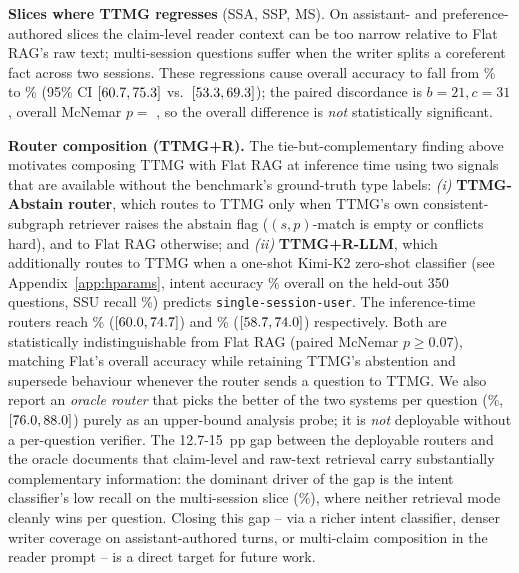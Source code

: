 \textbf{Slices where TTMG regresses} (SSA, SSP, MS). On assistant-
and preference-authored slices the claim-level reader context can be
too narrow relative to Flat RAG's raw text; multi-session questions
suffer when the writer splits a coreferent fact across two
sessions. These regressions cause overall accuracy to fall from
\FlatLMEAcc\% to \TTMGLMEAcc\% (95\% CI $[60.7, 75.3]$
vs.\ $[53.3, 69.3]$); the paired discordance is
$b{=}21, c{=}31$, overall McNemar $p =$ \McnemarOverall, so the
overall difference is \emph{not} statistically significant.

\textbf{Router composition (TTMG+R).} The tie-but-complementary
finding above motivates composing TTMG with Flat RAG at inference
time using two signals that are available without the benchmark's
ground-truth type labels: \emph{(i)} \textbf{TTMG-Abstain router},
which routes to TTMG only when TTMG's own consistent-subgraph
retriever raises the abstain flag ($(s, p)$-match is empty or
conflicts hard), and to Flat RAG otherwise; and \emph{(ii)}
\textbf{TTMG+R-LLM}, which additionally routes to TTMG when a
one-shot Kimi-K2 zero-shot classifier (see
Appendix~\ref{app:hparams}, intent accuracy \IntentAccOverall\%
overall on the held-out 350 questions, SSU recall
\IntentRecallSSU\%) predicts \texttt{single-session-user}. The
inference-time routers reach \AbstainRouterAcc\%
($[60.0, 74.7]$) and \LLMRouterAcc\%
($[58.7, 74.0]$) respectively. Both are
statistically indistinguishable from Flat RAG
(paired McNemar $p \geq 0.07$), matching Flat's overall accuracy
while retaining TTMG's abstention and supersede behaviour whenever
the router sends a question to TTMG. We also report an
\emph{oracle router} that picks the better of the two systems per
question (\OracleLMEAcc\%, $[76.0, 88.0]$)
purely as an upper-bound analysis probe; it is \emph{not}
deployable without a per-question verifier. The 12.7-15~pp gap
between the deployable routers and the oracle documents that
claim-level and raw-text retrieval carry substantially complementary
information: the dominant driver of the gap is the intent
classifier's low recall on the multi-session slice
(\IntentRecallMS\%), where neither retrieval mode cleanly wins per
question. Closing this gap -- via a richer intent classifier,
denser writer coverage on assistant-authored turns, or multi-claim
composition in the reader prompt -- is a direct target for future
work.

